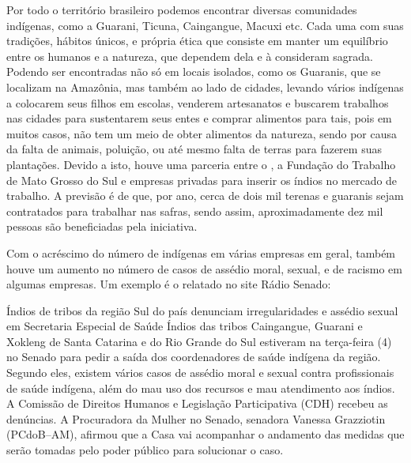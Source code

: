 \documentclass[12pt,oneside,a4paper,chapter=TITLE,section=TITLE,sumario
=tradicional]{abntex2}
\begin{document}
Por todo o território brasileiro podemos encontrar diversas comunidades indígenas, como a Guarani, Ticuna, Caingangue, Macuxi etc. Cada uma com suas tradições, hábitos únicos, e própria ética que consiste em manter um equilíbrio entre os humanos e a natureza, que dependem dela e à consideram sagrada. Podendo ser encontradas não só em locais isolados, como os Guaranis, que se localizam na Amazônia, mas também ao lado de cidades, levando vários indígenas a colocarem seus filhos em escolas, venderem artesanatos e buscarem trabalhos nas cidades para sustentarem seus entes e comprar alimentos para tais, pois em muitos casos, não tem um meio de obter alimentos da natureza, sendo por causa da falta de animais, poluição, ou até mesmo falta de terras para fazerem suas plantações. Devido a isto, houve uma parceria entre o , a Fundação do Trabalho de Mato Grosso do Sul e empresas privadas para inserir os índios no mercado de trabalho. A previsão é de que, por ano, cerca de dois mil terenas e guaranis sejam contratados para trabalhar nas safras, sendo assim, aproximadamente dez mil pessoas são beneficiadas pela iniciativa. 

Com o acréscimo do número de indígenas em várias empresas em geral, também houve um aumento no número de casos de assédio moral, sexual, e de racismo em algumas empresas. Um exemplo é o relatado no site Rádio Senado:

\vspace{1em}

\begin{flushright}
    \begin{minipage}{12cm}
        \footnotesize
        \linespread{1.0}\selectfont
        Índios de tribos da região Sul do país denunciam irregularidades e assédio sexual em Secretaria Especial de Saúde Índios das tribos Caingangue, Guarani e Xokleng de Santa Catarina e do Rio Grande do Sul estiveram na terça-feira (4) no Senado para pedir a saída dos coordenadores de saúde indígena da região. Segundo eles, existem vários casos de assédio moral e sexual contra profissionais de saúde indígena, além do mau uso dos recursos e mau atendimento aos índios.  A Comissão de Direitos Humanos e Legislação Participativa (CDH) recebeu as denúncias. A Procuradora da Mulher no Senado, senadora Vanessa Grazziotin (PCdoB–AM), afirmou que a Casa vai acompanhar o andamento das medidas que serão tomadas pelo poder público para solucionar o caso.
        
        \cite{indios-irregularidade-assedio}
    \end{minipage}
\end{flushright}
\end{document}
